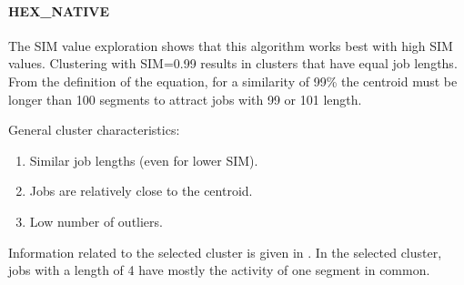 \documentclass{jhps}
\begin{document}
\FloatBarrier
\paragraph{HEX\_NATIVE}
The SIM value exploration shows that this algorithm works best with high SIM values.
Clustering with SIM=0.99 results in clusters that have equal job lengths.
From the definition of the equation, for a similarity of 99\% the centroid must be longer than 100 segments to attract jobs with 99 or 101 length.

General cluster characteristics:
\begin{enumerate}
 \item Similar job lengths (even for lower SIM).
 \item Jobs are relatively close to the centroid.
 \item Low number of outliers.
\end{enumerate}

Information related to the selected cluster is given in .
In the selected cluster, jobs with a length of 4 have mostly the activity of one segment in common.
\end{document}
